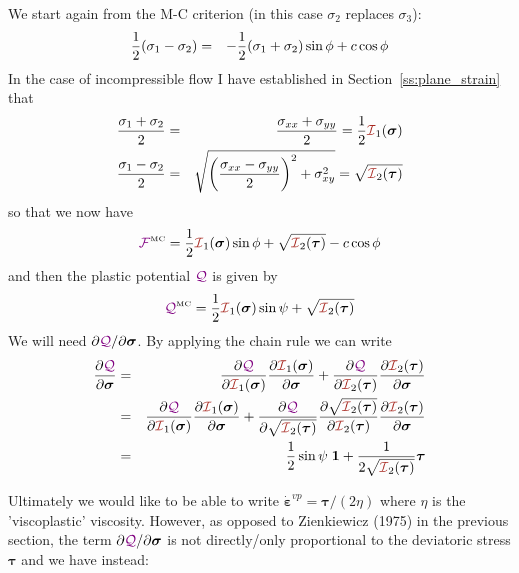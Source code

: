 We start again from the M-C criterion (in this case $\sigma_2$ replaces $\sigma_3$):
\begin{eqnarray}
\frac{1}{2}(\sigma_1-\sigma_2) &=& - \frac{1}{2}(\sigma_1+\sigma_2)  \sin \phi + c \cos \phi  \nonumber\\
\end{eqnarray}
In the case of incompressible flow I have established in Section~\ref{ss:plane_strain} that 
\begin{eqnarray}
\frac{\sigma_1+\sigma_2}{2} &=& \frac{\sigma_{xx}+\sigma_{yy}}{2} = \frac12 {\III}_1(\bm\sigma)\\
\frac{\sigma_1-\sigma_2}{2} &=& \sqrt{ \left(\frac{\sigma_{xx}-\sigma_{yy}}{2}\right)^2 + \sigma_{xy}^2  }
=\sqrt{ {\III}_2(\bm\tau)  }
\end{eqnarray}
so that we now have
\[
{\cal \FFF}^{\text{\tiny MC}} 
= \frac{1}{2}{\III}_1(\bm\sigma) \sin\phi  + 
\sqrt{ {\III}_2(\bm\tau)  }
-c \cos \phi 
\]
and then the plastic potential ${\color{violet}\cal Q}$ is given by
\[
{\QQQ}^{\text{\tiny MC}}=\frac{1}{2}{\III}_1(\bm\sigma) \sin\psi  + \sqrt{ {\III}_2(\bm\tau)  }
\]
We will need $\partial {{\color{violet}\cal Q}}/\partial \bm\sigma$.
By applying the chain rule we can write
\begin{eqnarray}
\frac{\partial {\QQQ}}{\partial \bm\sigma} 
&=&
\frac{\partial {\QQQ}}{\partial {\III}_1(\bm\sigma)} 
\frac{\partial {\III}_1(\bm\sigma)}{\partial \bm\sigma} 
+
\frac{\partial {\QQQ}}{\partial {\III}_2(\bm\tau)} 
\frac{\partial {\III}_2(\bm\tau)}{\partial \bm\sigma} \nn\\
&=&
\frac{\partial {\QQQ}}{\partial {\III}_1(\bm\sigma)} 
\frac{\partial {\III}_1(\bm\sigma)}{\partial \bm\sigma} 
+
\frac{\partial {\QQQ}}{\partial \sqrt{{\III}_2(\bm\tau)}} 
\frac{\partial \sqrt{ {\III}_2(\bm\tau)}   }{\partial {\III}_2(\bm\tau)} 
\frac{\partial {\III}_2(\bm\tau)}{\partial \bm\sigma} \nn\\
&=&
\frac12 \sin\psi \; {\bm 1} + \frac{1}{2 \sqrt{ {\III}_2(\bm\tau)}} 
\bm\tau
\end{eqnarray}

Ultimately we would like to be able to write $\dot{\bm \varepsilon}^{vp} = \bm\tau /(2\eta)$
where $\eta$ is the 'viscoplastic' viscosity. However, as opposed to Zienkiewicz (1975) in the 
previous section, the term $\partial {{\color{violet}\cal Q}}/\partial \bm\sigma$
is not directly/only proportional to the deviatoric stress $\bm\tau$ and we have instead:

